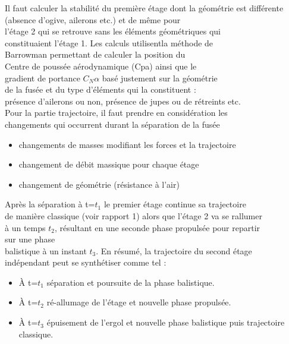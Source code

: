\documentclass[a4paper]{article}
\begin{document}
Il faut calculer la stabilité du première étage dont 
la géométrie est différente (absence d'ogive, ailerons etc.)
et de même pour\\
 l'étage 2
qui se retrouve sans les éléments
géométriques qui \\
constituaient l'étage 1. Les calculs utilisentla méthode de\\
Barrowman permettant de calculer la position du \\
Centre de poussée aérodynamique (Cpa) ainsi que le \\
gradient de portance $C_{N}\alpha$ basé justement sur la géométrie\\
de la fusée et du type d'éléments qui la constituent : \\
présence d'ailerons ou non, présence de jupes ou de rétreints etc.\\


Pour la partie trajectoire, il faut prendre en considération les\\
changements qui occurrent durant la séparation de la fusée

\begin{itemize}
\item changements de masses modifiant les forces et la trajectoire
\item changement de débit massique pour chaque étage
\item changement de géométrie (résistance à l'air)
\end{itemize}

Après la séparation à t=$t_{1}$ le premier étage continue sa trajectoire \\de manière classique (voir rapport 1) alors que l'étage 2 va se rallumer\\ à un temps $t_{2}$, résultant en une seconde phase propulsée pour repartir \\sur une phase \\balistique à un instant $t_{3}$. En résumé, la trajectoire du second étage\\ indépendant peut se synthétiser comme tel : \\

  


\begin{itemize}
\item À t=$t_{1}$ séparation et poursuite de la phase balistique.
\item À t=$t_{2}$ ré-allumage de l'étage et nouvelle phase propulsée.
\item À t=$t_{3}$ épuisement de l'ergol et nouvelle phase balistique puis trajectoire classique.

\end{itemize}
\end{document}
